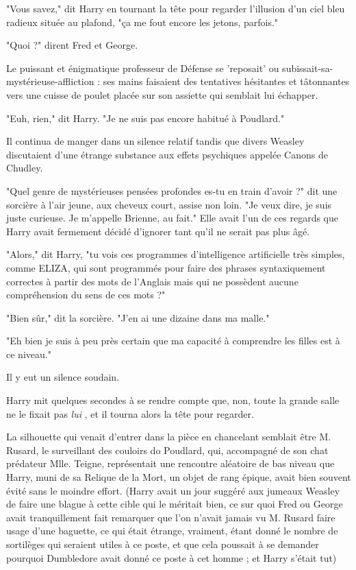 "Vous savez," dit Harry en tournant la tête pour regarder l'illusion d'un ciel bleu radieux située au plafond, "ça me fout encore les jetons, parfois."

"Quoi ?" dirent Fred et George.

Le puissant et énigmatique professeur de Défense se 'reposait' ou subissait-sa-mystérieuse-affliction : ses mains faisaient des tentatives hésitantes et tâtonnantes vers une cuisse de poulet placée sur son assiette qui semblait lui échapper.

"Euh, rien," dit Harry. "Je ne suis pas encore habitué à Poudlard."

Il continua de manger dans un silence relatif tandis que divers Weasley discutaient d'une étrange substance aux effets psychiques appelée Canons de Chudley.

"Quel genre de mystérieuses pensées profondes es-tu en train d'avoir ?" dit une sorcière à l'air jeune, aux cheveux court, assise non loin. "Je veux dire, je suis juste curieuse. Je m'appelle Brienne, au fait." Elle avait l'un de ces regards que Harry avait fermement décidé d'ignorer tant qu'il ne serait pas plus âgé.

"Alors," dit Harry, "tu vois ces programmes d'intelligence artificielle très simples, comme ELIZA, qui sont programmés pour faire des phrases syntaxiquement correctes à partir des mots de l'Anglais mais qui ne possèdent aucune compréhension du sens de ces mots ?"

"Bien sûr," dit la sorcière. "J'en ai une dizaine dans ma malle."

"Eh bien je suis à peu près certain que ma capacité à comprendre les filles est à ce niveau."

Il y eut un silence soudain.

Harry mit quelques secondes à se rendre compte que, non, toute la grande salle ne le fixait pas \emph{lui} , et il tourna alors la tête pour regarder.

La silhouette qui venait d'entrer dans la pièce en chancelant semblait être M. Rusard, le surveillant des couloirs do Poudlard, qui, accompagné de son chat prédateur Mlle. Teigne, représentait une rencontre aléatoire de bas niveau que Harry, muni de sa Relique de la Mort, un objet de rang épique, avait bien souvent évité sans le moindre effort. (Harry avait un jour suggéré aux jumeaux Weasley de faire une blague à cette cible qui le méritait bien, ce sur quoi Fred ou George avait tranquillement fait remarquer que l'on n'avait jamais vu M. Rusard faire usage d'une baguette, ce qui était étrange, vraiment, étant donné le nombre de sortilèges qui seraient utiles à ce poste, et que cela poussait à se demander pourquoi Dumbledore avait donné ce poste à cet homme ; et Harry s'était tut)

